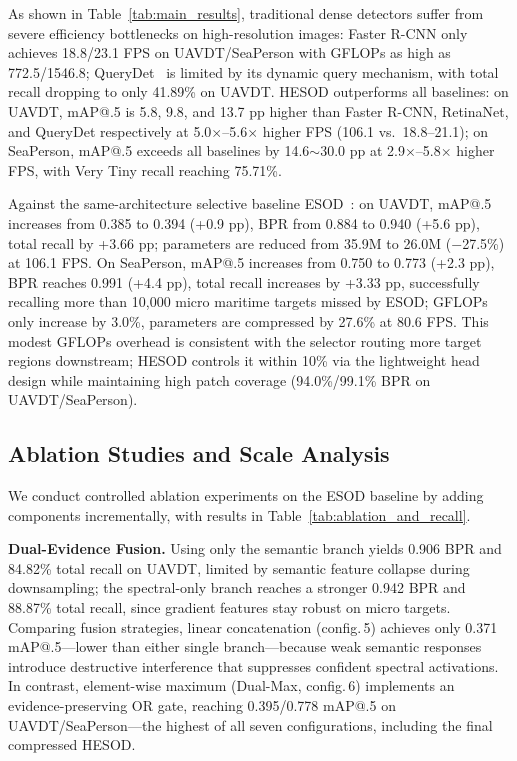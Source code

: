 As shown in Table~\ref{tab:main_results}, traditional dense detectors suffer from severe efficiency bottlenecks on high-resolution images: Faster R-CNN only achieves 18.8/23.1 FPS on UAVDT/SeaPerson with GFLOPs as high as 772.5/1546.8; QueryDet~\cite{QueryDet} is limited by its dynamic query mechanism, with total recall dropping to only 41.89\% on UAVDT.
HESOD outperforms all baselines: on UAVDT, mAP@.5 is 5.8, 9.8, and 13.7 pp higher than Faster R-CNN, RetinaNet, and QueryDet respectively at 5.0$\times$--5.6$\times$ higher FPS (106.1 vs.~18.8--21.1); on SeaPerson, mAP@.5 exceeds all baselines by 14.6$\sim$30.0 pp at 2.9$\times$--5.8$\times$ higher FPS, with Very Tiny recall reaching 75.71\%.

Against the same-architecture selective baseline ESOD~\cite{ESOD}: on UAVDT, mAP@.5 increases from 0.385 to 0.394 (+0.9 pp), BPR from 0.884 to 0.940 (+5.6 pp), total recall by +3.66 pp; parameters are reduced from 35.9M to 26.0M ($-$27.5\%) at 106.1 FPS.
On SeaPerson, mAP@.5 increases from 0.750 to 0.773 (+2.3 pp), BPR reaches 0.991 (+4.4 pp), total recall increases by +3.33 pp, successfully recalling more than 10,000 micro maritime targets missed by ESOD; GFLOPs only increase by 3.0\%, parameters are compressed by 27.6\% at 80.6 FPS.
This modest GFLOPs overhead is consistent with the selector routing more target regions downstream; HESOD controls it within 10\% via the lightweight head design while maintaining high patch coverage (94.0\%/99.1\% BPR on UAVDT/SeaPerson).

\subsection{Ablation Studies and Scale Analysis}

We conduct controlled ablation experiments on the ESOD baseline by adding components incrementally, with results in Table~\ref{tab:ablation_and_recall}.

\textbf{Dual-Evidence Fusion.} Using only the semantic branch yields 0.906 BPR and 84.82\% total recall on UAVDT, limited by semantic feature collapse during downsampling; the spectral-only branch reaches a stronger 0.942 BPR and 88.87\% total recall, since gradient features stay robust on micro targets.
Comparing fusion strategies, linear concatenation (config.\,5) achieves only 0.371 mAP@.5---lower than either single branch---because weak semantic responses introduce destructive interference that suppresses confident spectral activations. In contrast, element-wise maximum (Dual-Max, config.\,6) implements an evidence-preserving OR gate, reaching 0.395/0.778 mAP@.5 on UAVDT/SeaPerson---the highest of all seven configurations, including the final compressed HESOD.

